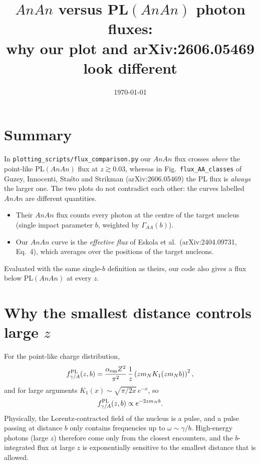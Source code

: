 \documentclass[11pt]{article}
\title{$AnAn$ versus PL$(AnAn)$ photon fluxes:\\
why our plot and arXiv:2606.05469 look different}
\author{}
\date{\today}
\begin{document}
\maketitle

\section{Summary}

In \texttt{plotting\_scripts/flux\_comparison.py} our $AnAn$ flux crosses \emph{above}
the point-like PL$(AnAn)$ flux at $z\gtrsim0.03$, whereas in
Fig.~\texttt{flux\_AA\_classes} of Guzey, Innocenti, Sta\'sto and Strikman
(arXiv:2606.05469) the PL flux is \emph{always} the larger one. The two plots
do not contradict each other: the curves labelled $AnAn$ are different
quantities.
\begin{itemize}
  \item Their $AnAn$ flux counts every photon at the centre of the target
    nucleus (single impact parameter $b$, weighted by $\Gamma_{AA}(b)$).
  \item Our $AnAn$ curve is the \emph{effective flux} of Eskola et al.\
    (arXiv:2404.09731, Eq.~4), which averages over the positions of the
    target nucleons.
\end{itemize}
Evaluated with the same single-$b$ definition as theirs, our code also gives
a flux below PL$(AnAn)$ at every $z$.

\section{Why the smallest distance controls large $z$}

For the point-like charge distribution,
\begin{equation}
  f^{\rm PL}_{\gamma/A}(z,b) = \frac{\alpha_{\rm em}Z^2}{\pi^2}\,\frac1z
  \left(z m_N K_1(z m_N b)\right)^2 ,
\end{equation}
and for large arguments $K_1(x)\sim\sqrt{\pi/2x}\,e^{-x}$, so
\begin{equation}
  f^{\rm PL}_{\gamma/A}(z,b) \propto e^{-2 z m_N b}.
\end{equation}
Physically, the Lorentz-contracted field of the nucleus is a pulse, and a
pulse passing at distance $b$ only contains frequencies up to
$\omega\sim\gamma/b$. High-energy photons (large $z$) therefore come only
from the closest encounters, and the $b$-integrated flux at large $z$ is
exponentially sensitive to the smallest distance that is allowed.
\end{document}
